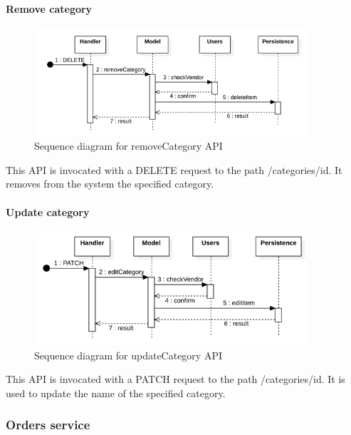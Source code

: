 \paragraph*{Remove category}
\begin{figure}[H]
    \includegraphics[width=0.9\textwidth]{res/images/sequence-diagrams/categories/removeCategory.png}
    \caption{Sequence diagram for removeCategory API}
\end{figure}
This API is invocated with a DELETE request to the path /categories/{id}. It removes from the system the specified category.

\paragraph*{Update category}
\begin{figure}[H]
    \includegraphics[width=0.9\textwidth]{res/images/sequence-diagrams/categories/updateCategory.png}
    \caption{Sequence diagram for updateCategory API}
\end{figure}
This API is invocated with a PATCH request to the path /categories/{id}. It is used to update the name of the specified category.


\subsubsection{Orders service}
